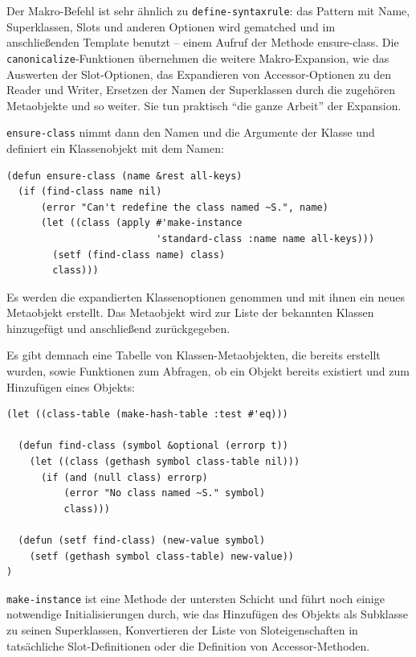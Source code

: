 Der Makro-Befehl ist sehr ähnlich zu \texttt{define-syntaxrule}: das Pattern mit Name, Superklassen, Slots und anderen Optionen wird gematched und im anschließenden Template benutzt -- einem Aufruf der Methode ensure-class. Die \texttt{canonicalize}-Funktionen übernehmen die weitere Makro-Expansion, wie das Auswerten der Slot-Optionen, das Expandieren von Accessor-Optionen zu den Reader und Writer, Ersetzen der Namen der Superklassen durch die zugehören Metaobjekte und so weiter. Sie tun praktisch ``die ganze Arbeit'' der Expansion.

\texttt{ensure-class} nimmt dann den Namen und die Argumente der Klasse und definiert ein Klassenobjekt mit dem Namen:

\begin{lstlisting}
(defun ensure-class (name &rest all-keys)
  (if (find-class name nil)
      (error "Can't redefine the class named ~S.", name)
      (let ((class (apply #'make-instance
                          'standard-class :name name all-keys)))
        (setf (find-class name) class)
        class)))
\end{lstlisting}

Es werden die expandierten Klassenoptionen genommen und mit ihnen ein neues Metaobjekt erstellt. Das Metaobjekt wird zur Liste der bekannten Klassen hinzugefügt und anschließend zurückgegeben. 

Es gibt demnach eine Tabelle von Klassen-Metaobjekten, die bereits erstellt wurden, sowie Funktionen zum Abfragen, ob ein Objekt bereits existiert und zum Hinzufügen eines Objekts:

\begin{lstlisting}
(let ((class-table (make-hash-table :test #'eq)))
  
  (defun find-class (symbol &optional (errorp t))
    (let ((class (gethash symbol class-table nil)))
      (if (and (null class) errorp)
          (error "No class named ~S." symbol)
          class)))
  
  (defun (setf find-class) (new-value symbol)
    (setf (gethash symbol class-table) new-value))
)
\end{lstlisting}

\texttt{make-instance} ist eine Methode der untersten Schicht und führt noch einige notwendige Initialisierungen durch, wie das Hinzufügen des Objekts als Subklasse zu seinen Superklassen, Konvertieren der Liste von Sloteigenschaften in tatsächliche Slot-Definitionen oder die Definition von Accessor-Methoden. 

